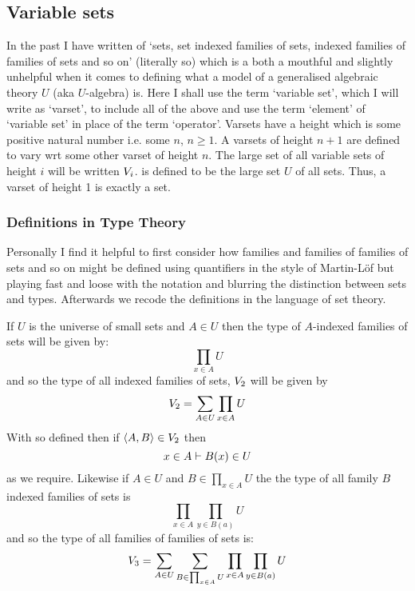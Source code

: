 \documentclass[10pt,a4paper]{scrartcl}
\begin{document}
\subsection{Variable sets}
\noindent In the past I have written of `sets, 
set indexed families of sets, indexed families of families of sets and so on' (literally so) which is  a both a mouthful and slightly unhelpful when it comes to
defining what a model of a generalised algebraic theory $U$ (aka $U$-algebra) is.
\noindent
Here I shall use the term `variable set', which I will write as `varset', to include all of the above and use the term `element'  of `variable set' in place of the term `operator'.
\noindent
Varsets have a height which is some positive natural number i.e. some $n$, $n \geq 1$. A varsets of height $n+1$ are defined to vary wrt some other varset of height $n$. The large set of all variable sets of height $i$ will be written $\varset[i]$.
\varset[1] is defined to be the large set $U$ of all sets. Thus, a varset of height 1 is exactly a set. 

\subsubsection{Definitions in Type Theory}
Personally I find it helpful to first consider how families and families of families of sets and so on might be defined using quantifiers in the style of Martin-L\"of but playing fast and loose with the notation and blurring the distinction between sets and types. Afterwards we recode the definitions in the language of set theory. 

\noindent
If $U$ is the universe of small sets  and $A \in U$ then the type 
of $A$-indexed families of sets will be given by:
\begin{equation*}
\prod_{x \in A}U
\end{equation*}
and so the type of all indexed families of sets, $\varset[2]$ will be given by
\begin{equation*}
\varset[2]=\sum_{A \in U}\prod_{x \in A}U
\end{equation*}
With \varset[2] so defined then if $\tuple{A,B} \in \varset[2]$ then
\begin{equation*}
x \in A \tstyle B(x) \in U 
\end{equation*}
as we require.
\noindent
Likewise if  $A \in U$ and $B \in \prod_{x \in A}U$ the the type of all
family $B$ indexed families of sets is
\begin{equation*}
\prod_{x \in A}\prod_{y \in B(a)}U
\end{equation*}
and so the type of all families of families of sets is:
\begin{equation*}
\varset[3]=\sum_{A \in U}\sum_{B \in \prod_{x \in A}U} \prod_{x \in A}\prod_{y \in B(a)}U
\end{equation*}
\end{document}
